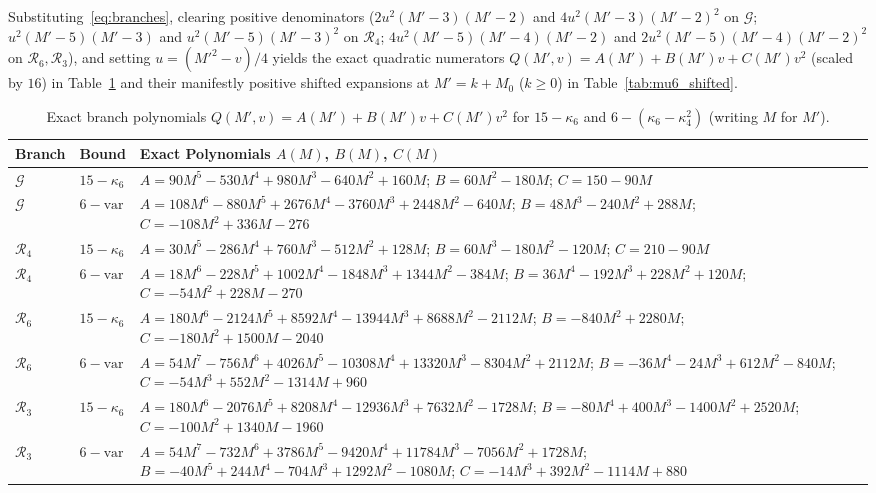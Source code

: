 \documentclass[11pt,a4paper]{article}
\theoremstyle{remark}
\begin{document}
Substituting~\eqref{eq:branches}, clearing positive denominators ($2u^2(M'-3)(M'-2)$ and $4u^2(M'-3)(M'-2)^2$ on $\mathcal{G}$; $u^2(M'-5)(M'-3)$ and $u^2(M'-5)(M'-3)^2$ on $\mathcal{R}_4$; $4u^2(M'-5)(M'-4)(M'-2)$ and $2u^2(M'-5)(M'-4)(M'-2)^2$ on $\mathcal{R}_6, \mathcal{R}_3$), and setting $u = (M'^2 - v)/4$ yields the exact quadratic numerators $Q(M', v) = A(M') + B(M') v + C(M') v^2$ (scaled by $16$) in Table~\ref{tab:mu6_polys} and their manifestly positive shifted expansions at $M' = k + M_0$ ($k \ge 0$) in Table~\ref{tab:mu6_shifted}.

\begin{table}[ht]
\centering
\caption{Exact branch polynomials $Q(M', v) = A(M') + B(M') v + C(M') v^2$ for $15 - \kappa_6$ and $6 - (\kappa_6 - \kappa_4^2)$ (writing $M$ for $M'$).}
\label{tab:mu6_polys}
\scriptsize
\setlength{\tabcolsep}{3.5pt}
\begin{tabular}{@{}ll>{\raggedright\arraybackslash}p{11.5cm}@{}}
\toprule
Branch & Bound & Exact Polynomials $A(M)$, $B(M)$, $C(M)$ \\
\midrule
$\mathcal{G}$ & $15{-}\kappa_6$ & $A = 90M^5 - 530M^4 + 980M^3 - 640M^2 + 160M$;\; $B = 60M^2 - 180M$;\; $C = 150 - 90M$ \\
$\mathcal{G}$ & $6{-}\mathrm{var}$ & $A = 108M^6 - 880M^5 + 2676M^4 - 3760M^3 + 2448M^2 - 640M$;\; $B = 48M^3 - 240M^2 + 288M$;\; $C = -108M^2 + 336M - 276$ \\
\midrule
$\mathcal{R}_4$ & $15{-}\kappa_6$ & $A = 30M^5 - 286M^4 + 760M^3 - 512M^2 + 128M$;\; $B = 60M^3 - 180M^2 - 120M$;\; $C = 210 - 90M$ \\
$\mathcal{R}_4$ & $6{-}\mathrm{var}$ & $A = 18M^6 - 228M^5 + 1002M^4 - 1848M^3 + 1344M^2 - 384M$;\; $B = 36M^4 - 192M^3 + 228M^2 + 120M$;\; $C = -54M^2 + 228M - 270$ \\
\midrule
$\mathcal{R}_6$ & $15{-}\kappa_6$ & $A = 180M^6 - 2124M^5 + 8592M^4 - 13944M^3 + 8688M^2 - 2112M$;\; $B = -840M^2 + 2280M$;\; $C = -180M^2 + 1500M - 2040$ \\
$\mathcal{R}_6$ & $6{-}\mathrm{var}$ & $A = 54M^7 - 756M^6 + 4026M^5 - 10308M^4 + 13320M^3 - 8304M^2 + 2112M$;\; $B = -36M^4 - 24M^3 + 612M^2 - 840M$;\; $C = -54M^3 + 552M^2 - 1314M + 960$ \\
\midrule
$\mathcal{R}_3$ & $15{-}\kappa_6$ & $A = 180M^6 - 2076M^5 + 8208M^4 - 12936M^3 + 7632M^2 - 1728M$;\; $B = -80M^4 + 400M^3 - 1400M^2 + 2520M$;\; $C = -100M^2 + 1340M - 1960$ \\
$\mathcal{R}_3$ & $6{-}\mathrm{var}$ & $A = 54M^7 - 732M^6 + 3786M^5 - 9420M^4 + 11784M^3 - 7056M^2 + 1728M$;\; $B = -40M^5 + 244M^4 - 704M^3 + 1292M^2 - 1080M$;\; $C = -14M^3 + 392M^2 - 1114M + 880$ \\
\bottomrule
\end{tabular}
\end{table}
\end{document}
